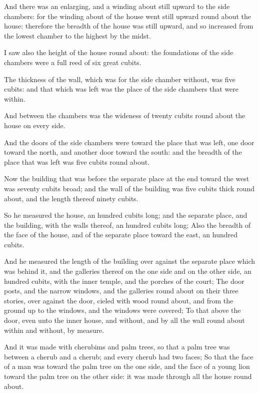 \Verse And there was an enlarging, and a winding about still upward to the side chambers: for the winding about of the house went still upward round about the house: therefore the breadth of the house was still upward, and so increased from the lowest chamber to the highest by the midst.

\Verse I saw also the height of the house round about: the foundations of the side chambers were a full reed of six great cubits.

\Verse The thickness of the wall, which was for the side chamber without, was five cubits: and that which was left was the place of the side chambers that were within.

\Verse And between the chambers was the wideness of twenty cubits round about the house on every side.

\Verse And the doors of the side chambers were toward the place that was left, one door toward the north, and another door toward the south: and the breadth of the place that was left was five cubits round about.

\Verse Now the building that was before the separate place at the end toward the west was seventy cubits broad; and the wall of the building was five cubits thick round about, and the length thereof ninety cubits.

\Verse So he measured the house, an hundred cubits long; and the separate place, and the building, with the walls thereof, an hundred cubits long; \Verse Also the breadth of the face of the house, and of the separate place toward the east, an hundred cubits.

\Verse And he measured the length of the building over against the separate place which was behind it, and the galleries thereof on the one side and on the other side, an hundred cubits, with the inner temple, and the porches of the court; \Verse The door posts, and the narrow windows, and the galleries round about on their three stories, over against the door, cieled with wood round about, and from the ground up to the windows, and the windows were covered; \Verse To that above the door, even unto the inner house, and without, and by all the wall round about within and without, by measure.

\Verse And it was made with cherubims and palm trees, so that a palm tree was between a cherub and a cherub; and every cherub had two faces; \Verse So that the face of a man was toward the palm tree on the one side, and the face of a young lion toward the palm tree on the other side: it was made through all the house round about.

